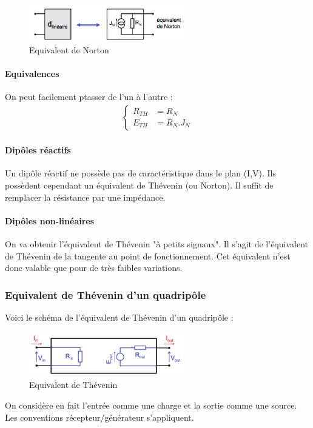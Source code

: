 \documentclass[a4paper]{article}
\begin{document}
    \begin{figure}[H]
        \begin{center}
            \includegraphics[width=0.6\textwidth]{fig/2_eqnorton.png}
            \caption{Equivalent de Norton}
            \label{fig:2_eqnorton}
        \end{center}
    \end{figure}

    \paragraph{Equivalences} On peut facilement ptasser de l'un à l'autre :
    \begin{align*}
        \begin{cases}
            R_{TH}&= R_N\\
            E_{TH}&= R_N . J_N
        \end{cases}
    \end{align*}

    \paragraph{Dipôles réactifs} Un dipôle réactif ne possède pas de caractéristique
    dans le plan (I,V). Ils possèdent cependant un équivalent de Thévenin (ou Norton).
    Il suffit de remplacer la résistance par une impédance.

    \paragraph{Dipôles non-linéaires} On va obtenir l'équivalent de Thévenin "à petits signaux".
    Il s'agit de l'équivalent de Thévenin de la tangente au point de fonctionnement.
    Cet équivalent n'est donc valable que pour de très faibles variations.

    \subsubsection{Equivalent de Thévenin d'un quadripôle}
    Voici le schéma de l'équivalent de Thévenin d'un quadripôle :
    \begin{figure}[H]
        \begin{center}
            \includegraphics[width=0.6\textwidth]{fig/2_eqtheveninquad.png}
            \caption{Equivalent de Thévenin}
            \label{fig:2_eqtheveninquad}
        \end{center}
    \end{figure}
    On considère en fait l'entrée comme une charge et la sortie comme une source.
    Les conventions récepteur/générateur s'appliquent.
\end{document}
